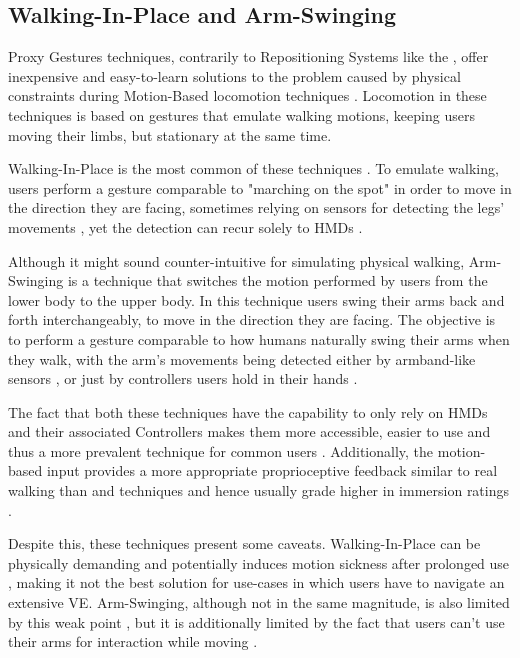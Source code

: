 \subsection{Walking-In-Place and Arm-Swinging}
\label{sec:wip-and-as}

Proxy Gestures techniques, contrarily to Repositioning Systems like the , offer inexpensive 
and easy-to-learn solutions to the problem caused by physical constraints during Motion-Based locomotion techniques \cite{Nilsson2018}. 
Locomotion in these techniques is based on gestures that emulate walking motions, keeping users moving their limbs, but 
stationary at the same time.

Walking-In-Place is the most common of these techniques \cite{Boletsis2019,Nilsson2018}. To emulate walking, users perform a 
gesture comparable to "marching on the spot" in order to move in the direction they are facing, sometimes relying on sensors for 
detecting the legs' movements \cite{Cherni2020}, yet the detection can recur solely to \glspl{HMD} \cite{Lee2018}.

Although it might sound counter-intuitive for simulating physical walking, Arm-Swinging is a technique that switches the 
motion performed by users from the lower body to the upper body. In this technique users swing their arms back and forth interchangeably, 
to move in the direction they are facing. The objective is to perform a gesture comparable to how humans naturally swing their 
arms when they walk, with the arm's movements being detected either by armband-like sensors \cite{Cherni2020}, or just by 
controllers users hold in their hands \cite{Coomer2018}.

The fact that both these techniques have the capability to only rely on \glspl{HMD} and their associated 
Controllers makes them more accessible, easier to use and thus a more prevalent technique 
for common users \cite{Nilsson2018}. Additionally, the motion-based input provides a more appropriate proprioceptive feedback 
similar to real walking than  and  
techniques and hence usually grade higher in immersion ratings \cite{Boletsis2019}. 

Despite this, these techniques present some caveats. Walking-In-Place can be physically demanding and potentially 
induces motion sickness after prolonged use \cite{Boletsis2019,Cherni2020}, making it not the best solution for use-cases 
in which users have to navigate an extensive \gls{VE}. Arm-Swinging, although not in the same magnitude, is also limited by this 
weak point \cite{Coomer2018}, but it is additionally limited by the fact that users can't use their arms for interaction 
while moving \cite{Nilsson2018}. 

